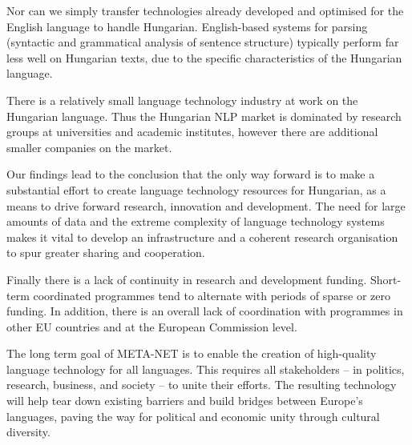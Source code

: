 \begin{multicols}{2}
Nor can we simply transfer technologies already developed and optimised for the English language to handle Hungarian. English-based systems for parsing (syntactic and grammatical analysis of sentence structure) typically perform far less well on Hungarian texts, due to the specific characteristics of the Hungarian language.

There is a relatively small language technology industry at work on the Hungarian language. Thus the Hungarian NLP market is dominated by research groups at universities and academic institutes, however there are additional smaller companies on the market.  

Our findings lead to the conclusion that the only way forward is to make a substantial effort to create language technology resources for Hungarian, as a means to drive forward research, innovation and development. The need for large amounts of data and the extreme complexity of language technology systems makes it vital to develop an infrastructure and a coherent research organisation to spur greater sharing and cooperation.

Finally there is a lack of continuity in research and development funding. Short-term coordinated programmes tend to alternate with periods of sparse or zero funding. In addition, there is an overall lack of coordination with programmes in other EU countries and at the European Commission level.

The long term goal of META-NET is to enable the creation of high-quality language technology for all languages. This requires all stakeholders -- in politics, research, business, and society -- to unite their efforts. The resulting technology will help tear down existing barriers and build bridges between Europe’s languages, paving the way for political and economic unity through cultural diversity. 
\end{multicols}

\clearpage
  
